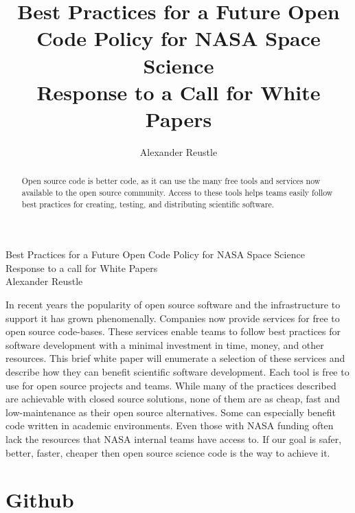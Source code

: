 \documentclass[12pt, letterpaper]{article}
\title{Best Practices for a Future Open Code Policy for NASA Space Science \\
Response to a Call for White Papers}
\author{Alexander Reustle}
\begin{document}
\begin{center}
\large {Best Practices for a Future Open Code Policy for NASA Space Science \\
Response to a call for White Papers}
\\
\normalsize {Alexander Reustle}

\end{center}

  \begin{abstract}
  Open source code is better code, as it can use the many free tools and services
  now available to the open source community. Access to these tools helps
  teams easily follow best practices for creating, testing, and
  distributing scientific software.
  \end{abstract}


  In recent years the popularity of open source software and the infrastructure
  to support it has grown phenomenally. Companies now provide
  services for free to open source code-bases. These services enable
  teams to follow best practices for software development with a minimal
  investment in time, money, and other resources. This brief white paper will
  enumerate a selection of these services and describe how they can benefit
  scientific software development. Each tool is free to use for open
  source projects and teams. While many of the practices described are
  achievable with closed source solutions, none of them are as cheap, fast and
  low-maintenance as their open source alternatives. Some can especially
  benefit code written in academic environments. Even those with NASA funding
  often lack the resources that NASA internal teams have access to. If our goal
  is safer, better, faster, cheaper then open source science code is the way to
  achieve it.

  \section*{\small Github}
\end{document}
